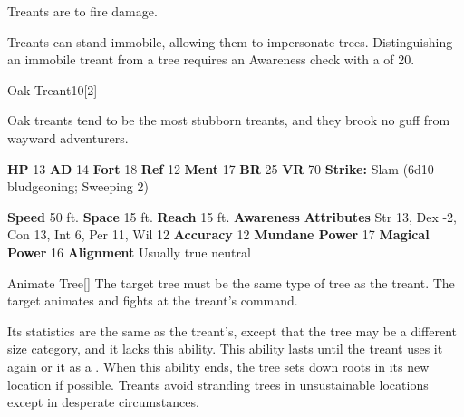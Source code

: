         Treants are  to fire damage.
      
        Treants can stand immobile, allowing them to impersonate trees.
        Distinguishing an immobile treant from a tree requires an Awareness check with a  of 20.
  

  \begin{monsubsection}{Oak Treant}{10}[2]
    \vspace{-1em}\vspace{-1em}
    \vspace{0em}

    
          Oak treants tend to be the most stubborn treants, and they brook no guff from wayward adventurers.
        

    \begin{spellcontent}
      \begin{spelltargetinginfo}
        \pari \textbf{HP} 13 \monsep
          \textbf{AD} 14 \monsep
          \textbf{Fort} 18 \monsep
          \textbf{Ref} 12 \monsep
          \textbf{Ment} 17
        \pari \textbf{BR} 25 \monsep
        \textbf{VR} 70
        \pari \textbf{Strike:}
            Slam  (6d10 bludgeoning; Sweeping 2)
      \end{spelltargetinginfo}
    \end{spellcontent}
    \begin{monsterfooter}
      \pari \textbf{Speed} 50 ft. \monsep
        \textbf{Space} 15 ft. \monsep
        \textbf{Reach} 15 ft.
      \pari \textbf{Awareness} 
      \pari \textbf{Attributes}
        Str 13, Dex -2,
        Con 13, Int 6,
        Per 11, Wil 12
      \pari \textbf{Accuracy} 12 \monsep
        \textbf{Mundane Power} 17 \monsep
      \textbf{Magical Power} 16
      \pari \textbf{Alignment} Usually true neutral
    \end{monsterfooter}
  \end{monsubsection}
  \begin{freeability}{Animate Tree}[]
      The target tree must be the same type of tree as the treant.
        The target animates and fights at the treant's command.

        Its statistics are the same as the treant's, except that the tree may be a different size category, and it lacks this ability.
        This ability lasts until the treant uses it again or  it as a .
        When this ability ends, the tree sets down roots in its new location if possible.
        Treants avoid stranding trees in unsustainable locations except in desperate circumstances.
    \end{freeability}
  

